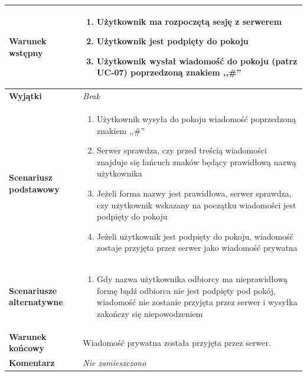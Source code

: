 \documentclass[11pt,oneside,a4paper,titlepage,onecolumn]{article}
\newenvironment{enumreq}
{ \begin{enumerate}[topsep=0pt,itemsep=-1ex,partopsep=1ex,parsep=1ex] }
{ \end{enumerate}                  }
\begin{document}
{\begin{tabular}{ | l | l | }
	\hline
		\parbox[t]{4cm}{\textbf{Warunek wstępny}} & \parbox[t]{11cm}{
			\begin{enumreq}
				\item Użytkownik ma rozpoczętą sesję z serwerem
				\item Użytkownik jest podpięty do pokoju
				\item Użytkownik wysłał wiadomość do pokoju (patrz UC-07)
				poprzedzoną znakiem ,,\#''
			\end{enumreq}
				
		}
		\\
		
	\hline
		\parbox[t]{4cm}{\textbf{Wyjątki}} & \parbox[t]{11cm}{
			\textit{Brak}
			
		}
		\\

	\hline
		\parbox[t]{4cm}{\textbf{Scenariusz podstawowy}} & \parbox[t]{11cm}{
			\begin{enumreq}
				\item Użytkownik wysyła do pokoju wiadomość poprzedzoną
				znakiem ,,\#''
				\item Serwer sprawdza, czy przed treścią wiadomości znajduje
				się łańcuch znaków będący prawidłową nazwą użytkownika
				\item Jeżeli forma nazwy jest prawidłowa, serwer sprawdza,
				czy użytkownik wskazany na początku wiadomości jest podpięty
				do pokoju
				\item Jeżeli użytkownik jest podpięty do pokoju, wiadomość
				zostaje przyjęta przez serwer jako wiadomość prywatna
			\end{enumreq}
		}
		\\
		
	\hline
		\parbox[t]{4cm}{\textbf{Scenariusze alternatywne}} & \parbox[t]
		{11cm}{
			\begin{enumreq}
				\item Gdy nazwa użytkownika odbiorcy ma nieprawidłową formę
				bądź odbiorca nie jest podpięty pod pokój, wiadomość nie
				zostanie przyjęta przez serwer i wysyłka zakończy się
				niepowodzeniem
			\end{enumreq}
		}
		\\
		
	\hline
		\parbox[t]{4cm}{\textbf{Warunek końcowy}} & \parbox[t]{11cm}{
			Wiadomość prywatna została przyjęta przez serwer.
		}
		\\
		
	\hline
		\parbox[t]{4cm}{\textbf{Komentarz}} & \parbox[t]{11cm}{
			\textit{Nie zamieszczono}
		}
		\\


\end{tabular}}
\end{document}
